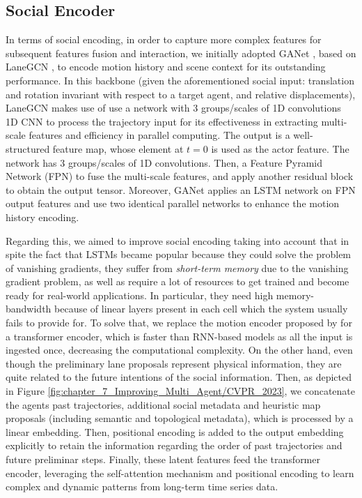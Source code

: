 \subsection{Social Encoder}
\label{subsubsec:7_improving_efficiency_social_encoder}

In terms of social encoding, in order to capture more complex features for subsequent features fusion and interaction, we initially adopted GANet \cite{wang2022ganet}, based on LaneGCN \cite{liang2020learning}, to encode motion history and scene context for its outstanding performance. In this backbone (given the aforementioned social input: translation and rotation invariant with respect to a target agent, and relative displacements), LaneGCN makes use of use a network with $3$ groups/scales of 1D convolutions 1D CNN to process the trajectory input for its effectiveness in extracting multi-scale features and efficiency in parallel computing. The output is a well-structured feature map, whose element at $t=0$ is used as the actor feature. The network has $3$ groups/scales of 1D convolutions. Then, a Feature Pyramid Network (FPN) \cite{lin2017feature} to fuse the multi-scale features, and apply another residual block to obtain the output tensor. Moreover, GANet applies an \ac{LSTM} network on FPN output features and use two identical parallel networks to enhance the motion history encoding.

Regarding this, we aimed to improve social encoding taking into account that in spite the fact that \acp{LSTM} became popular because they could solve the problem of vanishing gradients, they suffer from \textit{short-term memory} due to the vanishing gradient problem, as well as require a lot of resources to get trained and become ready for real-world applications. In particular, they need high memory-bandwidth because of linear layers present in each cell which the system usually fails to provide for. To solve that, we replace the motion encoder proposed by \cite{wang2022ganet} for a transformer encoder, which is faster than \ac{RNN}-based models as all the input is ingested once, decreasing the computational complexity. On the other hand, even though the preliminary lane proposals represent physical information, they are quite related to the future intentions of the social information. Then, as depicted in Figure \ref{fig:chapter_7_Improving_Multi_Agent/CVPR_2023}, we concatenate the agents past trajectories, additional social metadata and heuristic map proposals (including semantic and topological metadata), which is processed by a linear embedding. Then, positional encoding is added to the output embedding explicitly to retain the information regarding the order of past trajectories and future preliminar steps. Finally, these latent features feed the transformer encoder, leveraging the self-attention mechanism and positional encoding to learn complex and dynamic patterns from long-term time series data. 

